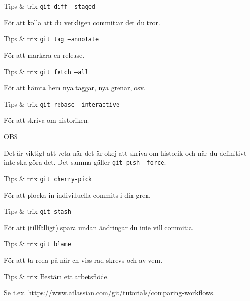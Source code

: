 \documentclass[11pt,xetex]{beamer}
\begin{document}
\begin{frame}{Tips \& trix}
  \Large
  \texttt{git diff --staged}

  \normalsize
  För att kolla att du verkligen commit:ar det du tror.
\end{frame}

\begin{frame}{Tips \& trix}
  \Large
  \texttt{git tag --annotate}

  \normalsize
  För att markera en release.
\end{frame}

\begin{frame}{Tips \& trix}
  \Large
  \texttt{git fetch --all}

  \normalsize
  För att hämta hem nya taggar, nya grenar, osv.
\end{frame}

\begin{frame}{Tips \& trix}
  \Large
  \texttt{git rebase --interactive}

  \normalsize
  För att skriva om historiken.

  \vspace{1em}
  \alert{\Large OBS}

  Det är viktigt att veta när det är okej att skriva om historik och när du
  definitivt inte ska göra det. Det samma gäller \texttt{git push
      --force}.
\end{frame}

\begin{frame}{Tips \& trix}
  \Large
  \texttt{git cherry-pick}

  \normalsize
  För att plocka in individuella commits i din gren.
\end{frame}

\begin{frame}{Tips \& trix}
  \Large
  \texttt{git stash}

  \normalsize
  För att (tillfälligt) spara undan ändringar du inte vill commit:a.
\end{frame}

\begin{frame}{Tips \& trix}
  \Large
  \texttt{git blame}

  \normalsize
  För att ta reda på när en viss rad skrevs och av vem.
\end{frame}

\begin{frame}{Tips \& trix}
  \Large
  Bestäm ett arbetsflöde.

  \normalsize
  Se t.ex. \url{https://www.atlassian.com/git/tutorials/comparing-workflows}.
\end{frame}
\end{document}
